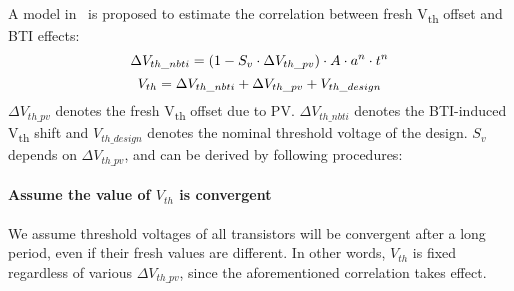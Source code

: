 A model in~\cite{gomez2016early} is proposed to estimate the correlation between fresh V\textsubscript{th} offset and BTI effects:
\begin{equation}
	\centering
	\fontsize{9}{9} \selectfont
	\Delta V_{th\_nbti} = (1 - S_{v} \cdot \Delta V_{th\_pv})  \cdot A \cdot a^n \cdot t^n
	\label{eq:cor}
\end{equation}
\begin{equation}
	\centering
	\fontsize{9}{9} \selectfont
	V_{th} = \Delta V_{th\_nbti} + \Delta V_{th\_pv} + V_{th\_design}
	\label{eq:conv}
\end{equation}
$\Delta V_{th\_pv}$ denotes the fresh V\textsubscript{th} offset due to PV. $\Delta V_{th\_nbti}$ denotes the BTI-induced V\textsubscript{th} shift and $V_{th\_design}$ denotes the nominal threshold voltage of the design. $S_{v}$ depends on $\Delta V_{th\_pv}$, and can be derived by following procedures:

\paragraph{Assume the value of $V_{th}$ is convergent}
We assume threshold voltages of all transistors will be convergent after a long period, even if their fresh values are different. In other words, $V_{th}$ is fixed regardless of various $\Delta V_{th\_pv}$, since the aforementioned correlation takes effect. 

